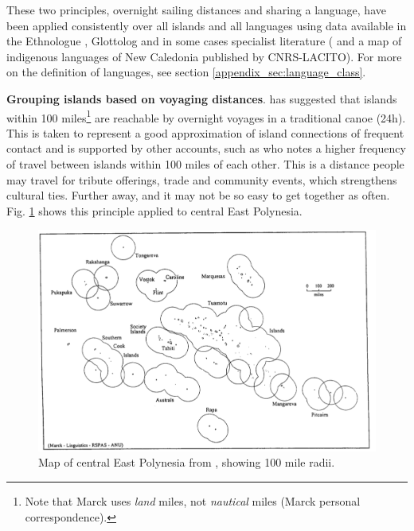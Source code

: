 \documentclass[12pt,letterpaper]{article}
\begin{document}
These two principles, overnight sailing distances and sharing a language, have been applied consistently over all islands and all languages using data available in the Ethnologue \citep{ethnologue22}, Glottolog \citep{glottolog3} and in some cases specialist literature (\citet{faaniu1983tuvalu,charpentier2012linguistic, francoisetatl2015, macdonald_2020, omniglot_tuvaluan} and a map of indigenous languages of New Caledonia published by CNRS-LACITO). For more on the definition of languages, see section \ref{appendix_sec:language_class}.




\textbf{Grouping islands based on voyaging distances}. \citet{mark_1986, marck2000} has suggested that islands within 100 miles\footnote{Note that Marck uses \emph{land} miles, not \emph{nautical} miles (Marck personal correspondence).} are reachable by overnight voyages in a traditional canoe (24h). This is taken to represent a good approximation of island connections of frequent contact and is supported by other accounts, such as \citep[38]{gladwin2009east} who notes a higher frequency of travel between islands within 100 miles of each other. This is a distance people may travel for tribute offerings, trade and community events, which strengthens cultural ties. Further away, and it may not be so easy to get together as often. Fig. \ref{appendix_Marck_2000_east_poly} shows this principle applied to central East Polynesia.

\begin{figure}[ht]
\centering
\includegraphics[width=\textwidth]{Marck_2000_east_poly}
\caption{{Map of central East Polynesia from \citet{marck2000}, showing 100 mile radii.}}
\label{appendix_Marck_2000_east_poly}
\end{figure}
\end{document}

